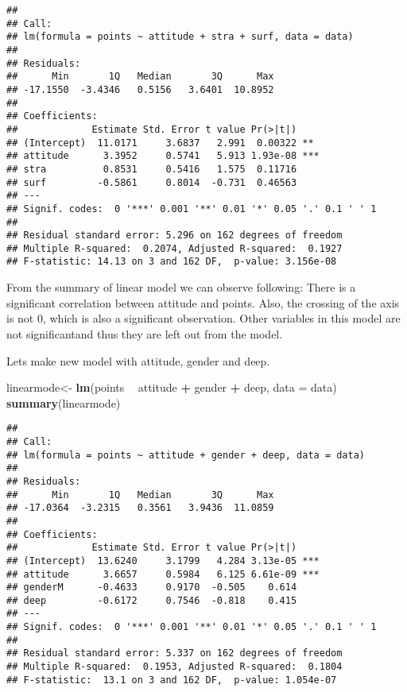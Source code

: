 \documentclass[
]{article}
\newenvironment{Shaded}{\begin{snugshade}}{\end{snugshade}}
\newcommand{\DataTypeTok}[1]{\textcolor[rgb]{0.13,0.29,0.53}{#1}}
\newcommand{\KeywordTok}[1]{\textcolor[rgb]{0.13,0.29,0.53}{\textbf{#1}}}
\newcommand{\NormalTok}[1]{#1}
\newcommand{\OperatorTok}[1]{\textcolor[rgb]{0.81,0.36,0.00}{\textbf{#1}}}
\newcommand{\StringTok}[1]{\textcolor[rgb]{0.31,0.60,0.02}{#1}}
\begin{document}
\begin{verbatim}
## 
## Call:
## lm(formula = points ~ attitude + stra + surf, data = data)
## 
## Residuals:
##      Min       1Q   Median       3Q      Max 
## -17.1550  -3.4346   0.5156   3.6401  10.8952 
## 
## Coefficients:
##             Estimate Std. Error t value Pr(>|t|)    
## (Intercept)  11.0171     3.6837   2.991  0.00322 ** 
## attitude      3.3952     0.5741   5.913 1.93e-08 ***
## stra          0.8531     0.5416   1.575  0.11716    
## surf         -0.5861     0.8014  -0.731  0.46563    
## ---
## Signif. codes:  0 '***' 0.001 '**' 0.01 '*' 0.05 '.' 0.1 ' ' 1
## 
## Residual standard error: 5.296 on 162 degrees of freedom
## Multiple R-squared:  0.2074, Adjusted R-squared:  0.1927 
## F-statistic: 14.13 on 3 and 162 DF,  p-value: 3.156e-08
\end{verbatim}

From the summary of linear model we can observe following: There is a
significant correlation between attitude and points. Also, the crossing
of the axis is not 0, which is also a significant observation. Other
variables in this model are not significantand thus they are left out
from the model.

Lets make new model with attitude, gender and deep.

\begin{Shaded}
\begin{Highlighting}[]
\NormalTok{linearmode<-}\StringTok{ }\KeywordTok{lm}\NormalTok{(points }\OperatorTok{~}\StringTok{ }\NormalTok{attitude }\OperatorTok{+}\StringTok{ }\NormalTok{gender }\OperatorTok{+}\StringTok{ }\NormalTok{deep, }\DataTypeTok{data =}\NormalTok{ data)}
\KeywordTok{summary}\NormalTok{(linearmode)}
\end{Highlighting}
\end{Shaded}

\begin{verbatim}
## 
## Call:
## lm(formula = points ~ attitude + gender + deep, data = data)
## 
## Residuals:
##      Min       1Q   Median       3Q      Max 
## -17.0364  -3.2315   0.3561   3.9436  11.0859 
## 
## Coefficients:
##             Estimate Std. Error t value Pr(>|t|)    
## (Intercept)  13.6240     3.1799   4.284 3.13e-05 ***
## attitude      3.6657     0.5984   6.125 6.61e-09 ***
## genderM      -0.4633     0.9170  -0.505    0.614    
## deep         -0.6172     0.7546  -0.818    0.415    
## ---
## Signif. codes:  0 '***' 0.001 '**' 0.01 '*' 0.05 '.' 0.1 ' ' 1
## 
## Residual standard error: 5.337 on 162 degrees of freedom
## Multiple R-squared:  0.1953, Adjusted R-squared:  0.1804 
## F-statistic:  13.1 on 3 and 162 DF,  p-value: 1.054e-07
\end{verbatim}
\end{document}
